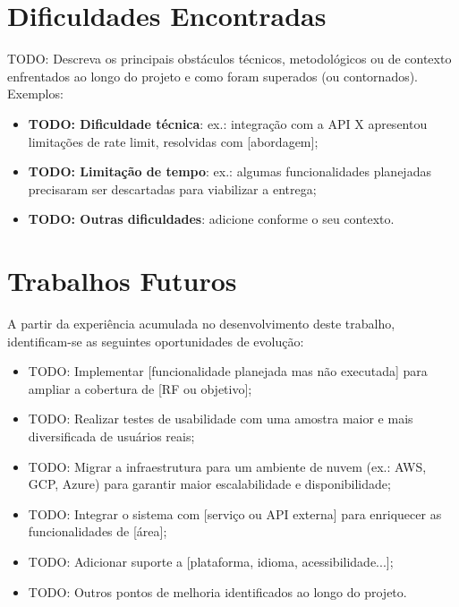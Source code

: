 \section{Dificuldades Encontradas}
\label{sec:dificuldades}

TODO: Descreva os principais obstáculos técnicos, metodológicos ou de
contexto enfrentados ao longo do projeto e como foram superados (ou
contornados). Exemplos:

\begin{itemize}
  \item \textbf{TODO: Dificuldade técnica}: ex.: integração com a API X
        apresentou limitações de rate limit, resolvidas com [abordagem];
  \item \textbf{TODO: Limitação de tempo}: ex.: algumas funcionalidades
        planejadas precisaram ser descartadas para viabilizar a entrega;
  \item \textbf{TODO: Outras dificuldades}: adicione conforme o seu contexto.
\end{itemize}


\section{Trabalhos Futuros}
\label{sec:trabalhos-futuros}

A partir da experiência acumulada no desenvolvimento deste trabalho,
identificam-se as seguintes oportunidades de evolução:

\begin{itemize}
  \item TODO: Implementar [funcionalidade planejada mas não executada]
        para ampliar a cobertura de [RF ou objetivo];
  \item TODO: Realizar testes de usabilidade com uma amostra maior e
        mais diversificada de usuários reais;
  \item TODO: Migrar a infraestrutura para um ambiente de nuvem (ex.:
        AWS, GCP, Azure) para garantir maior escalabilidade e
        disponibilidade;
  \item TODO: Integrar o sistema com [serviço ou API externa] para
        enriquecer as funcionalidades de [área];
  \item TODO: Adicionar suporte a [plataforma, idioma, acessibilidade...];
  \item TODO: Outros pontos de melhoria identificados ao longo do projeto.
\end{itemize}
